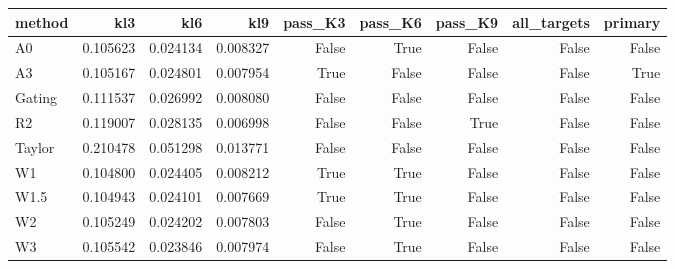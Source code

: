\begin{tabular}{lrrrrrrrr}
\toprule
method & kl3 & kl6 & kl9 & pass_K3 & pass_K6 & pass_K9 & all_targets & primary \\
\midrule
A0 & 0.105623 & 0.024134 & 0.008327 & False & True & False & False & False \\
A3 & 0.105167 & 0.024801 & 0.007954 & True & False & False & False & True \\
Gating & 0.111537 & 0.026992 & 0.008080 & False & False & False & False & False \\
R2 & 0.119007 & 0.028135 & 0.006998 & False & False & True & False & False \\
Taylor & 0.210478 & 0.051298 & 0.013771 & False & False & False & False & False \\
W1 & 0.104800 & 0.024405 & 0.008212 & True & True & False & False & False \\
W1.5 & 0.104943 & 0.024101 & 0.007669 & True & True & False & False & False \\
W2 & 0.105249 & 0.024202 & 0.007803 & False & True & False & False & False \\
W3 & 0.105542 & 0.023846 & 0.007974 & False & True & False & False & False \\
\bottomrule
\end{tabular}
